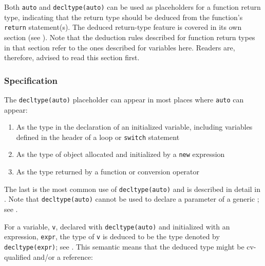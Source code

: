 Both \lstinline!auto! and \lstinline!decltype(auto)! can be used as
placeholders for a function return type, indicating that the return type
should be deduced from the function's \lstinline!return! statement(s). The
deduced return-type feature is covered in its own section (see
). Note that the deduction rules described for
function return types in that section refer to the ones described for
variables here. Readers are, therefore, advised to read this section
first.

\subsubsection[Specification]{Specification}\label{specification}

The \lstinline!decltype(auto)! placeholder can appear in most places where
\lstinline!auto! can appear:
\begin{enumerate}
\item{As the type in the declaration of an initialized variable, including variables defined in the header of a loop or \lstinline!switch! statement}
\item{As the type of object allocated and initialized by a \lstinline!new! expression}
\item{As the type returned by a function or conversion operator}
\end{enumerate}
The last is the most common use of \lstinline!decltype(auto)! and is
described in detail in . Note that
\lstinline!decltype(auto)! cannot be used to declare a parameter of a
generic ; see .

For a variable, \lstinline!v!, declared with \lstinline!decltype(auto)! and
initialized with an expression, \lstinline!expr!, the type of \lstinline!v! is
deduced to be the type denoted by \lstinline!decltype(expr)!; see
. This semantic means that the deduced
type might be cv-qualified and/or a reference:

